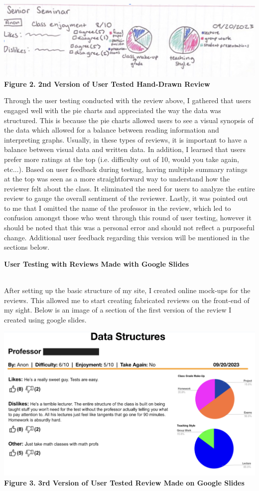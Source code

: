 \documentclass[10pt,twocolumn]{article}
\begin{document}
\includegraphics[scale=.25]{UT2}\\ \textbf{\footnotesize{Figure 2. 2nd Version of User Tested Hand-Drawn Review}}

Through the user testing conducted with the review above, I gathered that users engaged well with the pie charts and appreciated the way the data was structured. This is because the pie charts allowed users to see a visual synopsis of the data which allowed for a balance between reading information and interpreting graphs. Usually, in these types of reviews, it is important to have a balance between visual data and written data. In addition, I learned that users prefer more ratings at the top (i.e. difficulty out of 10, would you take again, etc...). Based on user feedback during testing, having multiple summary ratings at the top was seen as a more straightforward way to understand how the reviewer felt about the class. It eliminated the need for users to analyze the entire review to gauge the overall sentiment of the reviewer. Lastly, it was pointed out to me that I omitted the name of the professor in the review, which led to confusion amongst those who went through this round of user testing, however it should be noted that this was a personal error and should not reflect a purposeful change. Additional user feedback regarding this version will be mentioned in the sections below.\\


{\centering \textbf{User Testing with Reviews Made with Google Slides} \par}\\


After setting up the basic structure of my site, I created online mock-ups for the reviews. This allowed me to start creating fabricated reviews on the front-end of my sight. Below is an image of a section of the first version of the review I created using google slides. 

\includegraphics[scale=.25]{UT3}\\ \textbf{\footnotesize{Figure 3. 3rd Version of User Tested Review Made on Google Slides}}\\
\end{document}
